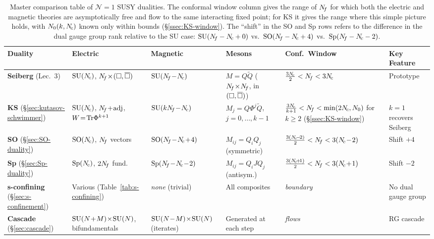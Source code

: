 \documentclass[11pt,a4paper]{article}
\newcommand{\SO}[1]{\mathrm{SO}(#1)}
\newcommand{\Sp}[1]{\mathrm{Sp}(#1)}
\begin{document}
\renewcommand{\arraystretch}{1.5}
\begin{table}[h!]
\centering
\small
\begin{tabular}{@{}p{2.0cm} p{2.3cm} p{2.3cm} p{2.0cm} p{2.3cm} p{2.5cm}@{}}
\toprule
\textbf{Duality} &
\textbf{Electric} &
\textbf{Magnetic} &
\textbf{Mesons} &
\textbf{Conf.\ Window} &
\textbf{Key Feature} \\
\midrule
\textbf{Seiberg} (Lec.~3) &
$\mathrm{SU}(N_{\!c})$, $N_{\!f}\!\times\!(\square,\overline{\square})$ &
$\mathrm{SU}(N_{\!f}\!-\!N_{\!c})$ &
$M = Q\widetilde{Q}$ ($N_{\!f}\!\times\!N_{\!f}$, in $(\square,\overline{\square})$) &
$\frac{3N_{\!c}}{2} < N_{\!f} < 3N_{\!c}$ &
Prototype \\
\midrule
\textbf{KS} (\S\ref{sec:kutasov-schwimmer}) &
$\mathrm{SU}(N_{\!c})$, $N_{\!f}\!+\!\mathrm{adj}$, $W\!=\!\mathrm{Tr}\Phi^{k+1}$ &
$\mathrm{SU}(kN_{\!f}\!-\!N_{\!c})$ &
$M_j = Q\Phi^j\widetilde{Q}$, $j=0,\ldots,k\!-\!1$ &
$\frac{3N_{\!c}}{k+1} < N_{\!f} < \min(2N_{\!c}, N_0)$ for $k \geq 2$ (\S\ref{ssec:KS-window}) &
$k\!=\!1$ recovers Seiberg \\
\midrule
\textbf{SO} (\S\ref{sec:SO-duality}) &
$\SO{\Nc}$, $N_{\!f}$ vectors &
$\SO{\Nf\!-\!\Nc\!+\!4}$ &
$M_{ij}=Q_iQ_j$ (symmetric) &
$\frac{3(N_{\!c}\!-\!2)}{2} < N_{\!f} < 3(N_{\!c}\!-\!2)$ &
Shift $+4$ \\
\midrule
\textbf{Sp} (\S\ref{sec:Sp-duality}) &
$\Sp{\Nc}$, $2N_{\!f}$ fund. &
$\Sp{\Nf\!-\!\Nc\!-\!2}$ &
$M_{ij}=Q_iJQ_j$ (antisym.) &
$\frac{3(N_{\!c}\!+\!1)}{2} < N_{\!f} < 3(N_{\!c}\!+\!1)$ &
Shift $-2$ \\
\midrule
\textbf{s-confining} (\S\ref{sec:s-confinement}) &
Various (Table~\ref{tab:s-confining}) &
\textit{none} (trivial) &
All composites &
\textit{boundary} &
No dual gauge group \\
\midrule
\textbf{Cascade} (\S\ref{sec:cascade}) &
$\mathrm{SU}(N\!+\!M)\!\times\!\mathrm{SU}(N)$, bifundamentals &
$\mathrm{SU}(N\!-\!M)\!\times\!\mathrm{SU}(N)$ (iterates) &
Generated at each step &
\textit{flows} &
RG cascade \\
\bottomrule
\end{tabular}
\caption{Master comparison table of $\mathcal{N}=1$ SUSY dualities.
The conformal window column gives the range of $N_{\!f}$ for which both
the electric and magnetic theories are asymptotically free and flow to
the same interacting fixed point; for KS it gives the range where this
simple picture holds, with $N_0(k, N_{\!c})$ known only within bounds
(\S\ref{ssec:KS-window}).  The ``shift'' in the SO and Sp
rows refers to the difference in the dual gauge group rank relative
to the SU case: $\mathrm{SU}(N_{\!f} - N_{\!c} + 0)$ vs.\ $\SO{\Nf - \Nc + 4}$
vs.\ $\Sp{\Nf - \Nc - 2}$.}
\label{tab:master-comparison}
\end{table}
\end{document}
